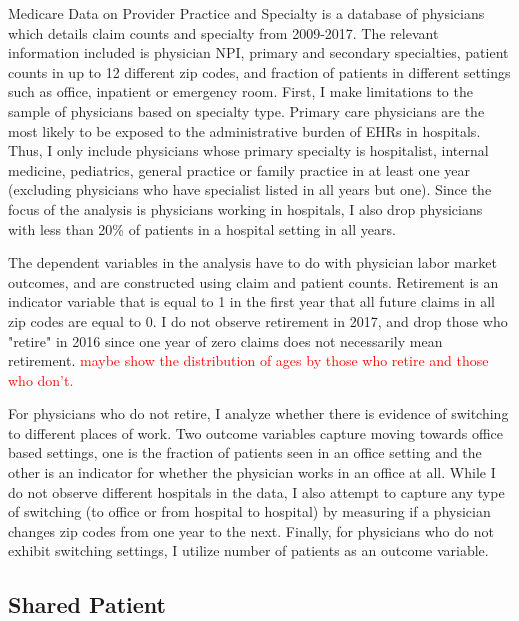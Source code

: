 \documentclass[11pt]{article}
\begin{document}
Medicare Data on Provider Practice and Specialty is a database of physicians which details claim counts and specialty from 2009-2017. The relevant information included is physician NPI, primary and secondary specialties, patient counts in up to 12 different zip codes, and fraction of patients in different settings such as office, inpatient or emergency room. First, I make limitations to the sample of physicians based on specialty type. Primary care physicians are the most likely to be exposed to the administrative burden of EHRs in hospitals. Thus, I only include physicians whose primary specialty is hospitalist, internal medicine, pediatrics, general practice or family practice in at least one year (excluding physicians who have specialist listed in all years but one). Since the focus of the analysis is physicians working in hospitals, I also drop physicians with less than 20\% of patients in a hospital setting in all years.

The dependent variables in the analysis have to do with physician labor market outcomes, and are constructed using claim and patient counts. Retirement is an indicator variable that is equal to 1 in the first year that all future claims in all zip codes are equal to 0. I do not observe retirement in 2017, and drop those who "retire" in 2016 since one year of zero claims does not necessarily mean retirement. \textcolor{red}{maybe show the distribution of ages by those who retire and those who don't.} 

For physicians who do not retire, I analyze whether there is evidence of switching to different places of work. Two outcome variables capture moving towards office based settings, one is the fraction of patients seen in an office setting and the other is an indicator for whether the physician works in an office at all. While I do not observe different hospitals in the data, I also attempt to capture any type of switching (to office or from hospital to hospital) by measuring if a physician changes zip codes from one year to the next. Finally, for physicians who do not exhibit switching settings, I utilize number of patients as an outcome variable. 


\subsection{Shared Patient}
\end{document}
